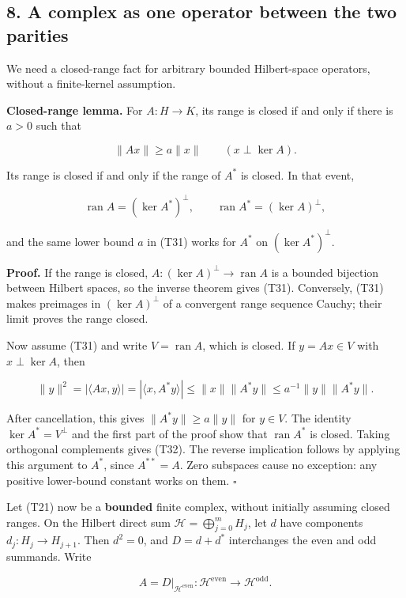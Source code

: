 \documentclass[
  11pt,
]{article}
\begin{document}
\subsection{8. A complex as one operator between the two
parities}\label{a-complex-as-one-operator-between-the-two-parities}

We need a closed-range fact for arbitrary bounded Hilbert-space
operators, without a finite-kernel assumption.

\textbf{Closed-range lemma.} For \(A:H\to K\), its range is closed if
and only if there is \(a>0\) such that

\[
\|Ax\|\geq a\|x\|\qquad(x\perp\ker A).                       \tag{T31}
\]

Its range is closed if and only if the range of \(A^*\) is closed. In
that event,

\[
\operatorname{ran}A=(\ker A^*)^\perp,\qquad
\operatorname{ran}A^*=(\ker A)^\perp,                        \tag{T32}
\]

and the same lower bound \(a\) in (T31) works for \(A^*\) on
\((\ker A^*)^\perp\).

\textbf{Proof.} If the range is closed,
\(A:(\ker A)^\perp\to\operatorname{ran}A\) is a bounded bijection
between Hilbert spaces, so the inverse theorem gives (T31). Conversely,
(T31) makes preimages in \((\ker A)^\perp\) of a convergent range
sequence Cauchy; their limit proves the range closed.

Now assume (T31) and write \(V=\operatorname{ran}A\), which is closed.
If \(y=Ax\in V\) with \(x\perp\ker A\), then

\[
\|y\|^2=|\langle Ax,y\rangle|
=|\langle x,A^*y\rangle|
\leq\|x\|\|A^*y\|
\leq a^{-1}\|y\|\|A^*y\|.
\]

After cancellation, this gives \(\|A^*y\|\geq a\|y\|\) for \(y\in V\).
The identity \(\ker A^*=V^\perp\) and the first part of the proof show
that \(\operatorname{ran}A^*\) is closed. Taking orthogonal complements
gives (T32). The reverse implication follows by applying this argument
to \(A^*\), since \(A^{**}=A\). Zero subspaces cause no exception: any
positive lower-bound constant works on them. \(\square\)

Let (T21) now be a \textbf{bounded} finite complex, without initially
assuming closed ranges. On the Hilbert direct sum
\(\mathscr H=\bigoplus_{j=0}^mH_j\), let \(d\) have components
\(d_j:H_j\to H_{j+1}\). Then \(d^2=0\), and \(D=d+d^*\) interchanges the
even and odd summands. Write

\[
A=D|_{\mathscr H^{\mathrm{even}}}:
\mathscr H^{\mathrm{even}}\longrightarrow\mathscr H^{\mathrm{odd}}.
\]
\end{document}
